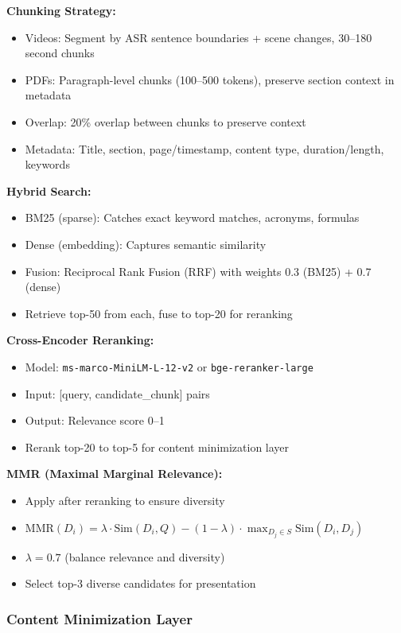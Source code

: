 \documentclass[11pt,letterpaper]{article}
\begin{document}
\textbf{Chunking Strategy:}
\begin{itemize}
\item Videos: Segment by ASR sentence boundaries + scene changes, 30--180 second chunks
\item PDFs: Paragraph-level chunks (100--500 tokens), preserve section context in metadata
\item Overlap: 20\% overlap between chunks to preserve context
\item Metadata: Title, section, page/timestamp, content type, duration/length, keywords
\end{itemize}

\textbf{Hybrid Search:}
\begin{itemize}
\item BM25 (sparse): Catches exact keyword matches, acronyms, formulas
\item Dense (embedding): Captures semantic similarity
\item Fusion: Reciprocal Rank Fusion (RRF) with weights 0.3 (BM25) + 0.7 (dense)
\item Retrieve top-50 from each, fuse to top-20 for reranking
\end{itemize}

\textbf{Cross-Encoder Reranking:}
\begin{itemize}
\item Model: \texttt{ms-marco-MiniLM-L-12-v2} or \texttt{bge-reranker-large}
\item Input: [query, candidate\_chunk] pairs
\item Output: Relevance score 0--1
\item Rerank top-20 to top-5 for content minimization layer
\end{itemize}

\textbf{MMR (Maximal Marginal Relevance):}
\begin{itemize}
\item Apply after reranking to ensure diversity
\item $\text{MMR}(D_i) = \lambda \cdot \text{Sim}(D_i, Q) - (1-\lambda) \cdot \max_{D_j \in S} \text{Sim}(D_i, D_j)$
\item $\lambda = 0.7$ (balance relevance and diversity)
\item Select top-3 diverse candidates for presentation
\end{itemize}

\subsubsection{Content Minimization Layer}\label{subsubsec:content-minimization}
\end{document}
